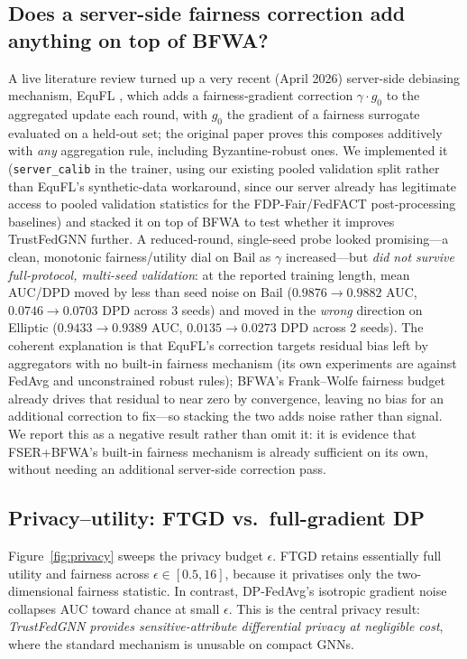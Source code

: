 \documentclass[pdflatex,sn-mathphys-num]{sn-jnl}
\theoremstyle{thmstyleone}%
\theoremstyle{thmstyletwo}%
\theoremstyle{thmstylethree}%
\begin{document}
\subsection{Does a server-side fairness correction add anything on top of BFWA?}
\label{sec:exp-equfl}
A live literature review turned up a very recent (April 2026) server-side
debiasing mechanism, EquFL \cite{yu2026equfl}, which adds a fairness-gradient
correction $\gamma\cdot g_0$ to the aggregated update each round, with $g_0$
the gradient of a fairness surrogate evaluated on a held-out set; the original
paper proves this composes additively with \emph{any} aggregation rule,
including Byzantine-robust ones. We implemented it (\texttt{server\_calib} in
the trainer, using our existing pooled validation split rather than EquFL's
synthetic-data workaround, since our server already has legitimate access to
pooled validation statistics for the FDP-Fair/FedFACT post-processing
baselines) and stacked it on top of BFWA to test whether it improves
TrustFedGNN further. A reduced-round, single-seed probe looked promising---a
clean, monotonic fairness/utility dial on Bail as $\gamma$ increased---but
\emph{did not survive full-protocol, multi-seed validation}: at the reported
training length, mean AUC/DPD moved by less than seed noise on Bail
($0.9876{\to}0.9882$ AUC, $0.0746{\to}0.0703$ DPD across 3 seeds) and moved in
the \emph{wrong} direction on Elliptic ($0.9433{\to}0.9389$ AUC,
$0.0135{\to}0.0273$ DPD across 2 seeds). The coherent explanation is that
EquFL's correction targets residual bias left by aggregators with no built-in
fairness mechanism (its own experiments are against FedAvg and unconstrained
robust rules); BFWA's Frank--Wolfe fairness budget already drives that
residual to near zero by convergence, leaving no bias for an additional
correction to fix---so stacking the two adds noise rather than signal. We
report this as a negative result rather than omit it: it is evidence that
FSER+BFWA's built-in fairness mechanism is already sufficient on its own,
without needing an additional server-side correction pass.

\subsection{Privacy--utility: FTGD vs.\ full-gradient DP}
\label{sec:exp-privacy}
Figure~\ref{fig:privacy} sweeps the privacy budget $\epsilon$. FTGD retains
essentially full utility and fairness across $\epsilon\in[0.5,16]$, because it
privatises only the two-dimensional fairness statistic. In contrast, DP-FedAvg's
isotropic gradient noise collapses AUC toward chance at small $\epsilon$. This is
the central privacy result: \emph{TrustFedGNN provides sensitive-attribute
differential privacy at negligible cost}, where the standard mechanism is
unusable on compact GNNs.
\end{document}
